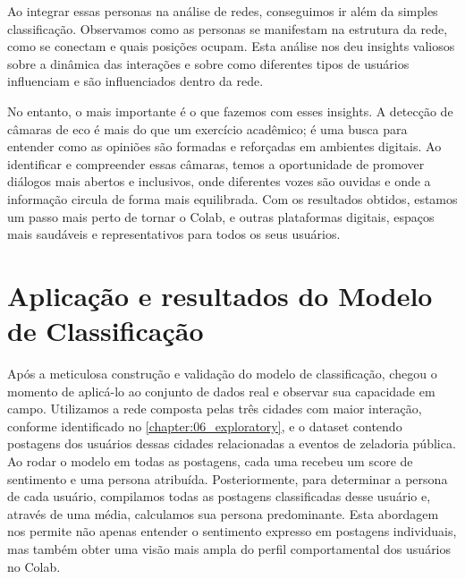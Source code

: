 Ao integrar essas personas na análise de redes, conseguimos ir além da simples classificação. Observamos como as personas se manifestam na estrutura da rede, como se conectam e quais posições ocupam. Esta análise nos deu insights valiosos sobre a dinâmica das interações e sobre como diferentes tipos de usuários influenciam e são influenciados dentro da rede.

No entanto, o mais importante é o que fazemos com esses insights. A detecção de câmaras de eco é mais do que um exercício acadêmico; é uma busca para entender como as opiniões são formadas e reforçadas em ambientes digitais. Ao identificar e compreender essas câmaras, temos a oportunidade de promover diálogos mais abertos e inclusivos, onde diferentes vozes são ouvidas e onde a informação circula de forma mais equilibrada. Com os resultados obtidos, estamos um passo mais perto de tornar o Colab, e outras plataformas digitais, espaços mais saudáveis e representativos para todos os seus usuários.

\section{Aplicação e resultados do Modelo de Classificação}

Após a meticulosa construção e validação do modelo de classificação, chegou o momento de aplicá-lo ao conjunto de dados real e observar sua capacidade em campo. Utilizamos a rede composta pelas três cidades com maior interação, conforme identificado no \autoref{chapter:06_exploratory}, e o dataset contendo postagens dos usuários dessas cidades relacionadas a eventos de zeladoria pública. Ao rodar o modelo em todas as postagens, cada uma recebeu um score de sentimento e uma persona atribuída. Posteriormente, para determinar a persona de cada usuário, compilamos todas as postagens classificadas desse usuário e, através de uma média, calculamos sua persona predominante. Esta abordagem nos permite não apenas entender o sentimento expresso em postagens individuais, mas também obter uma visão mais ampla do perfil comportamental dos usuários no Colab.

